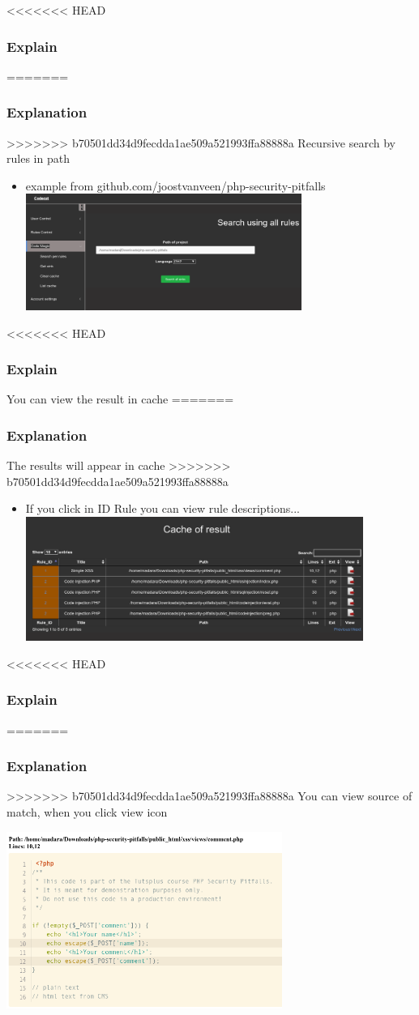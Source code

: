 \documentclass[serif,mathserif]{beamer}
\begin{document}
\begin{frame}
<<<<<<< HEAD
  \frametitle{Explain}
=======
  \frametitle{Explanation}
>>>>>>> b70501dd34d9fecdda1ae509a521993ffa88888a
  Recursive search by rules in path
  \begin{itemize}	
  \item example from github.com/joostvanveen/php-security-pitfalls
  \includegraphics[width=9cm]{images/allsinks.png} 
  \end{itemize}
\end{frame}

\begin{frame}
<<<<<<< HEAD
  \frametitle{Explain}
  You can view the result in cache
=======
  \frametitle{Explanation}
  The results will appear in cache
>>>>>>> b70501dd34d9fecdda1ae509a521993ffa88888a
  \begin{itemize}
  \item If you click in ID Rule you can view rule descriptions...		  
  \includegraphics[width=11cm]{images/cache.png} 
  \end{itemize}
\end{frame}


\begin{frame}
<<<<<<< HEAD
  \frametitle{Explain}
=======
  \frametitle{Explanation}
>>>>>>> b70501dd34d9fecdda1ae509a521993ffa88888a
  You can view source of match, when you click view icon
  \begin{itemize}	
  \includegraphics[width=9cm]{images/codeview.png} 
  \end{itemize}
\end{frame}
\end{document}
